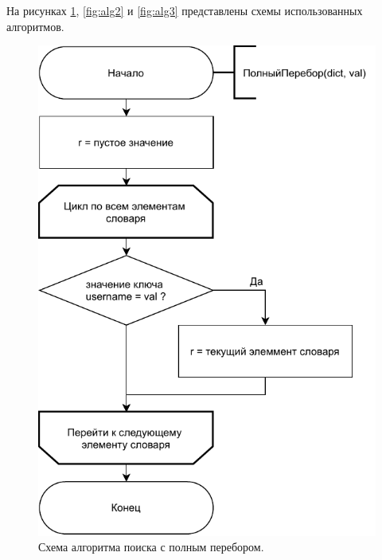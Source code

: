 \documentclass[12pt]{report}
\begin{document}
	На рисунках \ref{fig:alg1}, \ref{fig:alg2} и \ref{fig:alg3} представлены схемы использованных алгоритмов.
	
	\begin{figure}[H]
		\begin{center}
			\includegraphics[scale=0.8]{img/brute_scheme.pdf}
			\caption{Схема алгоритма поиска с полным перебором.}
			\label{fig:alg1}
		\end{center}
	\end{figure}
	
\end{document}
